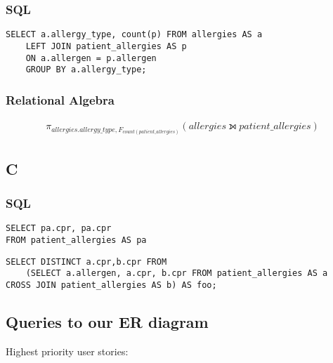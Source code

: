 \documentclass[a4paper,11pt]{article}
\begin{document}
\subsubsection{SQL}

\begin{verbatim}
SELECT a.allergy_type, count(p) FROM allergies AS a
    LEFT JOIN patient_allergies AS p
    ON a.allergen = p.allergen 
    GROUP BY a.allergy_type;
\end{verbatim}

\subsubsection{Relational Algebra}
\begin{align*}
   \pi_{allergies.allergy\_type, F_{count( patient\_allergies )}} (allergies \leftouterjoin patient\_allergies)
\end{align*}

\subsection{C}
\subsubsection{SQL}

\begin{verbatim}
SELECT pa.cpr, pa.cpr
FROM patient_allergies AS pa
\end{verbatim}

\begin{verbatim}
SELECT DISTINCT a.cpr,b.cpr FROM 
    (SELECT a.allergen, a.cpr, b.cpr FROM patient_allergies AS a
CROSS JOIN patient_allergies AS b) AS foo;
\end{verbatim}



% 


\subsection{Queries to our ER diagram}
Highest priority user stories:\\
\end{document}
